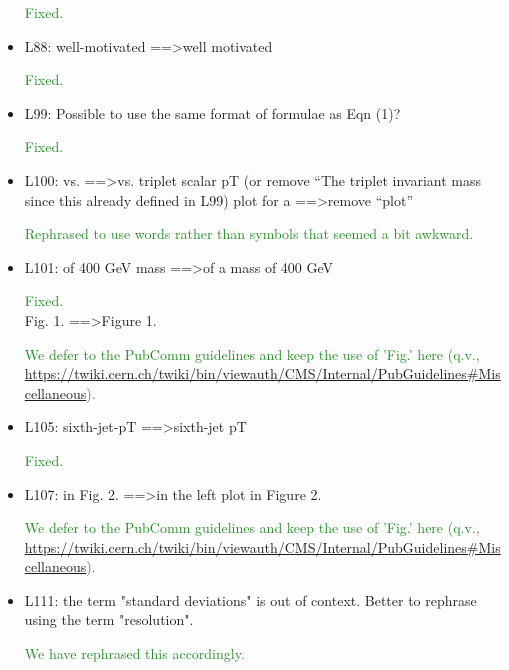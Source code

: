 \documentclass[paper=a4, fontsize=11pt]{scrartcl}
\begin{document}
\begin{itemize}
\textcolor{ForestGreen}{Fixed.}\\


\item L88: 
well-motivated ==\textgreater well motivated 

\textcolor{ForestGreen}{Fixed.}\\


\item L99: 
Possible to use the same format of formulae as Eqn (1)? 

\textcolor{ForestGreen}{Fixed.}\\


\item L100: 
vs. ==\textgreater vs. triplet scalar pT (or remove “The triplet invariant mass since 
this already defined in L99) 
plot for a ==\textgreater remove “plot” 

\textcolor{ForestGreen}{Rephrased to use words rather than symbols that seemed a bit awkward.}\\


\item L101: 
of 400 GeV mass ==\textgreater of a mass of 400 GeV 

\textcolor{ForestGreen}{Fixed.}\\


Fig. 1. ==\textgreater Figure 1. 

\textcolor{ForestGreen}{We defer to the PubComm guidelines and keep the use of 'Fig.' here
(q.v., \url{https://twiki.cern.ch/twiki/bin/viewauth/CMS/Internal/PubGuidelines\#Miscellaneous}).}\\


\item L105: 
sixth-jet-pT ==\textgreater sixth-jet pT 

\textcolor{ForestGreen}{Fixed.}\\

\item L107: 
in Fig. 2. ==\textgreater in the left plot in Figure 2. 

\textcolor{ForestGreen}{We defer to the PubComm guidelines and keep the use of 'Fig.' here
(q.v., \url{https://twiki.cern.ch/twiki/bin/viewauth/CMS/Internal/PubGuidelines\#Miscellaneous}).}\\


\item L111: 
the term "standard deviations" is out of context. Better to rephrase using 
the term "resolution". 

\textcolor{ForestGreen}{We have rephrased this accordingly.}\\


\end{itemize}
\end{document}

